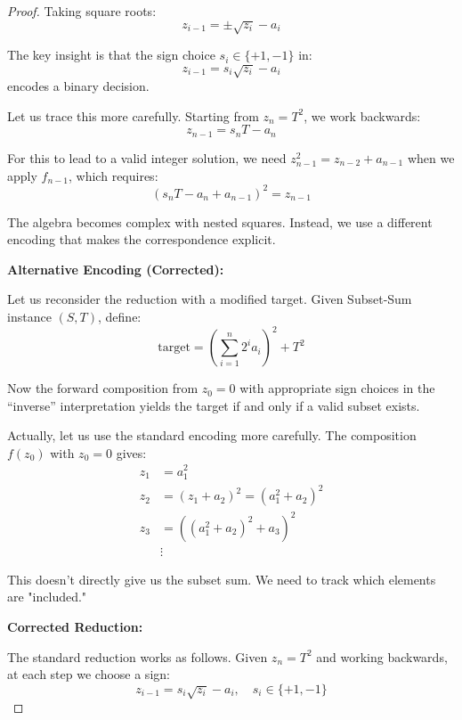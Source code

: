 \documentclass[12pt,a4paper]{article}
\begin{document}
\begin{proof}
Taking square roots:
\begin{equation}
z_{i-1} = \pm\sqrt{z_i} - a_i
\end{equation}

The key insight is that the sign choice $s_i \in \{+1, -1\}$ in:
\begin{equation}
z_{i-1} = s_i \sqrt{z_i} - a_i
\end{equation}
encodes a binary decision.

Let us trace this more carefully. Starting from $z_n = T^2$, we work backwards:
\begin{equation}
z_{n-1} = s_n T - a_n
\end{equation}

For this to lead to a valid integer solution, we need $z_{n-1}^2 = z_{n-2} + a_{n-1}$ when we apply $f_{n-1}$, which requires:
\begin{equation}
(s_n T - a_n + a_{n-1})^2 = z_{n-1}
\end{equation}

The algebra becomes complex with nested squares. Instead, we use a different encoding that makes the correspondence explicit.

\textbf{Alternative Encoding (Corrected):}

Let us reconsider the reduction with a modified target. Given Subset-Sum instance $(S,T)$, define:
\begin{equation}
\text{target} = \left(\sum_{i=1}^n 2^i a_i\right)^2 + T^2
\end{equation}

Now the forward composition from $z_0 = 0$ with appropriate sign choices in the ``inverse'' interpretation yields the target if and only if a valid subset exists.

Actually, let us use the standard encoding more carefully. The composition $f(z_0)$ with $z_0 = 0$ gives:
\begin{align}
z_1 &= a_1^2 \\
z_2 &= (z_1 + a_2)^2 = (a_1^2 + a_2)^2 \\
z_3 &= ((a_1^2 + a_2)^2 + a_3)^2 \\
&\vdots
\end{align}

This doesn't directly give us the subset sum. We need to track which elements are "included."

\textbf{Corrected Reduction:}

The standard reduction works as follows. Given $z_n = T^2$ and working backwards, at each step we choose a sign:
\begin{equation}
z_{i-1} = s_i\sqrt{z_i} - a_i, \quad s_i \in \{+1, -1\}
\end{equation}


\end{proof}
\end{document}
